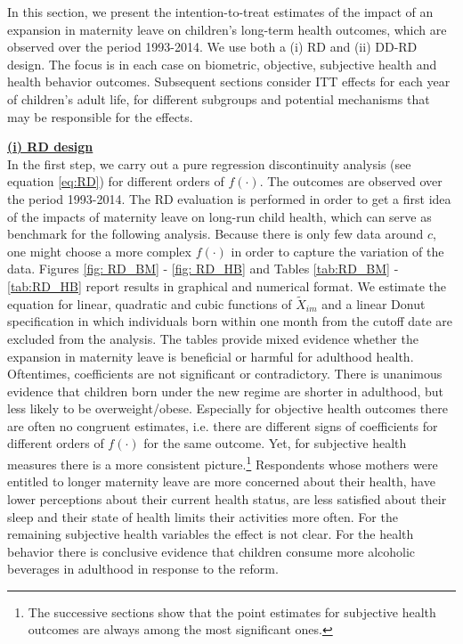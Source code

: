 \documentclass[a4paper ]{article}
\begin{document}
In this section, we present the intention-to-treat estimates of the impact of an expansion in maternity leave on children's long-term health outcomes, which are observed over the period 1993-2014. We use both a (i) RD and (ii) DD-RD design. The focus is in each case on biometric, objective, subjective health and health behavior outcomes. Subsequent sections consider ITT effects for each year of children's adult life, for different subgroups and potential mechanisms that may be responsible for the effects.

\bigskip
\underline{\textbf{(i) RD design}}\\
In the first step, we carry out a pure regression discontinuity analysis (see equation \ref{eq:RD}) for different orders of $f(\cdot)$. The outcomes are observed over the period 1993-2014. The RD evaluation is performed in order to get a first idea of the impacts of maternity leave on long-run child health, which can serve as benchmark for the following analysis. Because there is only few data around $c$, one might choose a more complex $f(\cdot)$ in order to capture the variation of the data.\newline 
Figures \ref{fig: RD_BM} - \ref{fig: RD_HB} and Tables 
\ref{tab:RD_BM} - \ref{tab:RD_HB} report results in graphical and numerical format. We estimate the equation for linear, quadratic and cubic functions of $\tilde X_{im}$ and a linear Donut specification in which individuals born within one month from the cutoff date are excluded from the analysis.
The tables provide mixed evidence whether the expansion in maternity leave is beneficial or harmful for adulthood health. Oftentimes, coefficients are not significant or contradictory. \newline
There is unanimous evidence that children born under the new regime are shorter in adulthood, but less likely to be overweight/obese. Especially for objective health outcomes there are often no congruent estimates, i.e. there are different signs of coefficients for different orders of $f(\cdot)$ for the same outcome. Yet, for subjective health measures there is a more consistent picture.\footnote{The successive sections show that the point estimates for subjective health outcomes are always among the most significant ones.} Respondents whose mothers were entitled to longer maternity leave are more concerned about their health, have lower perceptions about their current health status, are less satisfied about their sleep and their state of health limits their activities more often. For the remaining subjective health variables the effect is not clear. For the health behavior there is conclusive evidence that children consume more alcoholic beverages in adulthood in response to the reform. \newline
\end{document}
